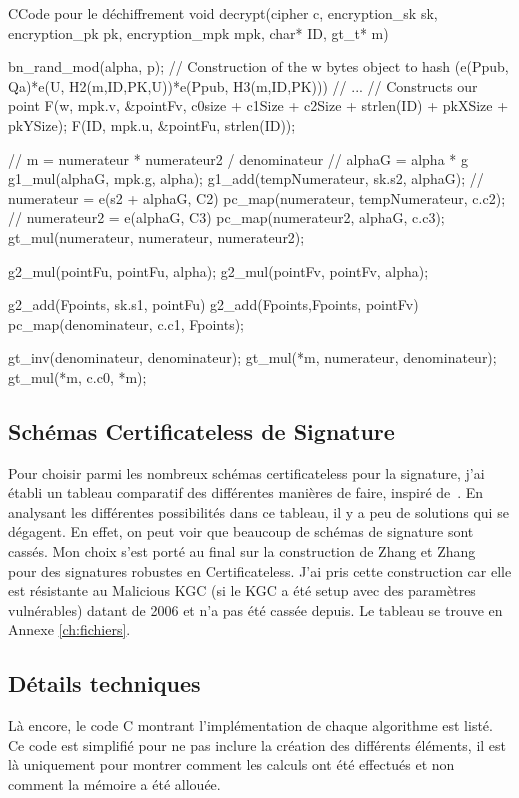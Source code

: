 \begin{sourcebox}{C}{Code pour le déchiffrement}
	void decrypt(cipher c, encryption_sk sk, encryption_pk pk, encryption_mpk  mpk, char* ID, gt_t* m){
		bn_rand_mod(alpha, p);
		// Construction of the w bytes object to hash (e(Ppub, Qa)*e(U, H2(m,ID,PK,U))*e(Ppub, H3(m,ID,PK)))
		// ...
		// Constructs our point
		F(w, mpk.v, &pointFv, c0size + c1Size + c2Size + strlen(ID) + pkXSize + pkYSize);
		F(ID, mpk.u, &pointFu, strlen(ID));
		
		// m = numerateur * numerateur2 / denominateur
		// alphaG = alpha * g
		g1_mul(alphaG, mpk.g, alpha);
		g1_add(tempNumerateur, sk.s2, alphaG);
		// numerateur = e(s2 + alphaG, C2)
		pc_map(numerateur, tempNumerateur, c.c2);
		// numerateur2 = e(alphaG, C3)
		pc_map(numerateur2, alphaG, c.c3);
		gt_mul(numerateur, numerateur, numerateur2);
		
		g2_mul(pointFu, pointFu, alpha);
		g2_mul(pointFv, pointFv, alpha);
		
		g2_add(Fpoints, sk.s1, pointFu)
		g2_add(Fpoints,Fpoints, pointFv)
		pc_map(denominateur, c.c1, Fpoints);
		
		gt_inv(denominateur, denominateur);
		gt_mul(*m, numerateur, denominateur);
		gt_mul(*m, c.c0, *m);
	}
\end{sourcebox}

\subsection{Schémas Certificateless de Signature}
Pour choisir parmi les nombreux schémas certificateless pour la signature, j'ai établi un tableau comparatif des différentes manières de faire, inspiré de~\cite{bookIntroCertificateless}. En analysant les différentes possibilités dans ce tableau, il y a peu de solutions qui se dégagent. En effet, on peut voir que beaucoup de schémas de signature sont cassés. Mon choix s'est porté au final sur la construction de Zhang et Zhang~\cite{conf/acns/ZhangWXF06} pour des signatures robustes en Certificateless. J'ai pris cette construction car elle est résistante au Malicious KGC (si le KGC a été setup avec des paramètres vulnérables) datant de 2006 et n'a pas été cassée depuis. Le tableau se trouve en Annexe \ref{ch:fichiers}.
\subsection{Détails techniques}
Là encore, le code C montrant l'implémentation de chaque algorithme est listé. Ce code est simplifié pour ne pas inclure la création des différents éléments, il est là uniquement pour montrer comment les calculs ont été effectués et non comment la mémoire a été allouée.
 
